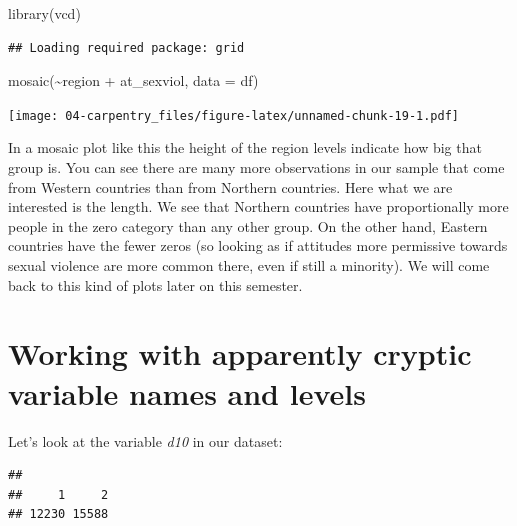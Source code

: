 \documentclass[
]{book}
\newenvironment{Shaded}{\begin{snugshade}}{\end{snugshade}}
\newcommand{\AttributeTok}[1]{\textcolor[rgb]{0.77,0.63,0.00}{#1}}
\newcommand{\FunctionTok}[1]{\textcolor[rgb]{0.00,0.00,0.00}{#1}}
\newcommand{\NormalTok}[1]{#1}
\newcommand{\SpecialCharTok}[1]{\textcolor[rgb]{0.00,0.00,0.00}{#1}}
\begin{document}
\begin{Shaded}
\begin{Highlighting}[]
\FunctionTok{library}\NormalTok{(vcd)}
\end{Highlighting}
\end{Shaded}

\begin{verbatim}
## Loading required package: grid
\end{verbatim}

\begin{Shaded}
\begin{Highlighting}[]
\FunctionTok{mosaic}\NormalTok{(}\SpecialCharTok{\textasciitilde{}}\NormalTok{region }\SpecialCharTok{+}\NormalTok{ at\_sexviol, }\AttributeTok{data =}\NormalTok{ df)}
\end{Highlighting}
\end{Shaded}

\texttt{[image: 04-carpentry\_files/figure-latex/unnamed-chunk-19-1.pdf]}

In a mosaic plot like this the height of the region levels indicate how big that group is. You can see there are many more observations in our sample that come from Western countries than from Northern countries. Here what we are interested is the length. We see that Northern countries have proportionally more people in the zero category than any other group. On the other hand, Eastern countries have the fewer zeros (so looking as if attitudes more permissive towards sexual violence are more common there, even if still a minority). We will come back to this kind of plots later on this semester.

\hypertarget{working-with-apparently-cryptic-variable-names-and-levels}{%
\section{Working with apparently cryptic variable names and levels}\label{working-with-apparently-cryptic-variable-names-and-levels}}

Let's look at the variable \emph{d10} in our dataset:

\begin{Shaded}
\end{Shaded}

\begin{verbatim}
## 
##     1     2 
## 12230 15588
\end{verbatim}
\end{document}
